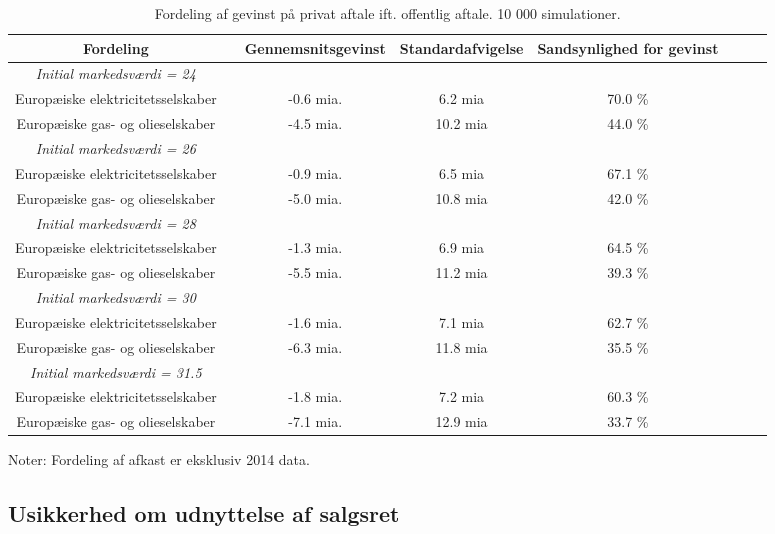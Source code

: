 \documentclass{article}
\begin{document}
\begin{table}[h]
	\caption{Fordeling af gevinst p\aa{} privat aftale ift. offentlig aftale. 10 000 simulationer.}
	\label{tab:robust_initial_pris}
	\begin{tabularx}{\linewidth}{cXcccccr}
	\toprule[1pt]
	Fordeling && Gennemsnitsgevinst & Standardafvigelse & Sandsynlighed for gevinst\\
	\hline 
	\emph{Initial markedsv\ae{}rdi = 24} \\
		Europ\ae{}iske elektricitetsselskaber && -0.6 mia. & 6.2 mia & 70.0  \% \\
	Europ\ae{}iske gas- og olieselskaber && -4.5 mia. & 10.2 mia & 44.0  \% \\
		\emph{Initial markedsv\ae{}rdi = 26} \\
		Europ\ae{}iske elektricitetsselskaber && -0.9 mia. & 6.5 mia & 67.1  \% \\
	Europ\ae{}iske gas- og olieselskaber && -5.0 mia. & 10.8 mia & 42.0  \% \\
			\emph{Initial markedsv\ae{}rdi = 28} \\
		Europ\ae{}iske elektricitetsselskaber && -1.3 mia. & 6.9 mia & 64.5  \% \\
	Europ\ae{}iske gas- og olieselskaber && -5.5 mia. & 11.2 mia & 39.3  \% \\
			\emph{Initial markedsv\ae{}rdi = 30} \\
		Europ\ae{}iske elektricitetsselskaber && -1.6 mia. & 7.1 mia & 62.7  \% \\
	Europ\ae{}iske gas- og olieselskaber && -6.3 mia. & 11.8 mia & 35.5  \% \\
				\emph{Initial markedsv\ae{}rdi = 31.5} \\
		Europ\ae{}iske elektricitetsselskaber && -1.8 mia. & 7.2 mia & 60.3  \% \\
	Europ\ae{}iske gas- og olieselskaber && -7.1 mia. & 12.9 mia & 33.7  \% \\

		\bottomrule[1pt]
	\end{tabularx}
	\begin{minipage}{\linewidth}
		\footnotesize{Noter: Fordeling af afkast er eksklusiv 2014 data.}
	\end{minipage}
\end{table}

\subsection{Usikkerhed om udnyttelse af salgsret}
\end{document}
